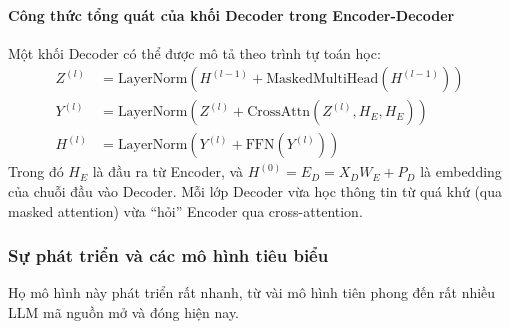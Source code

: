 \paragraph{Công thức tổng quát của khối Decoder trong Encoder-Decoder}
Một khối Decoder có thể được mô tả theo trình tự toán học:
\[
\begin{aligned}
	Z^{(l)} &= \text{LayerNorm}(H^{(l-1)} + \text{MaskedMultiHead}(H^{(l-1)})) \\
	Y^{(l)} &= \text{LayerNorm}(Z^{(l)} + \text{CrossAttn}(Z^{(l)}, H_E, H_E)) \\
	H^{(l)} &= \text{LayerNorm}(Y^{(l)} + \text{FFN}(Y^{(l)}))
\end{aligned}
\]
Trong đó $H_E$ là đầu ra từ Encoder, và $H^{(0)} = E_D = X_D W_E + P_D$ là embedding của chuỗi đầu vào Decoder.  
Mỗi lớp Decoder vừa học thông tin từ quá khứ (qua masked attention) vừa “hỏi” Encoder qua cross-attention.

\subsubsection{Sự phát triển và các mô hình tiêu biểu}
Họ mô hình này phát triển rất nhanh, từ vài mô hình tiên phong đến rất nhiều LLM mã nguồn mở và đóng hiện nay.
